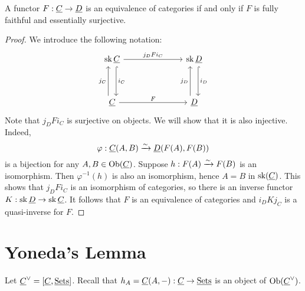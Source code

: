 
\begin{theorem*}
	A functor \( F: \underline{C} \to \underline{D} \) is an equivalence of categories if and only if \( F \) is fully faithful and essentially surjective.
\end{theorem*}
\begin{proof}
	We introduce the following notation:
	\[
		\begin{tikzcd}{\opn{sk} \C} &&& {\opn{sk} \D} \\
			\\
			\C &&& {\D}
			\arrow["{j_D F i_C}", from=1-1, to=1-4]
			\arrow["{i_C}", shift left=2, hook, from=1-1, to=3-1]
			\arrow["{i_D}", shift left=2, hook, from=1-4, to=3-4]
			\arrow["{j_C}", shift left=2, from=3-1, to=1-1]
			\arrow["F", from=3-1, to=3-4]
			\arrow["{j_D}", shift left=2, from=3-4, to=1-4]
		\end{tikzcd}
	\]
	Note that \( j_D F i_C \) is surjective on objects. We will show that it is also injective. Indeed,
	\[
		\varphi: \underline{C}(A, B) \xrightarrow{\sim} \underline{D}(F(A), F(B))
	\]
	is a bijection for any \( A, B \in \operatorname{Ob}(\underline{C}) \). Suppose \( h: F(A) \xrightarrow{\sim} F(B) \) is an isomorphism. Then \( \varphi^{-1}(h) \) is also an isomorphism, hence \( A = B \) in \( \operatorname{sk}(\underline{C}) \). This shows that \( j_D F i_C \) is an isomorphism of categories, so there is an inverse functor \( K: \operatorname{sk} \underline{D} \to \operatorname{sk} \underline{C} \). It follows that \( F \) is an equivalence of categories and \( i_D K j_C \) is a quasi-inverse for \( F \).
\end{proof}

\section{Yoneda's Lemma}

Let \( \underline{C}^\vee = [\underline{C}, \underline{\mathrm{Sets}}] \). Recall that \( h_A = \underline{C}(A, -): \underline{C} \to \underline{\mathrm{Sets}} \) is an object of \( \operatorname{Ob}(\underline{C}^\vee) \).

